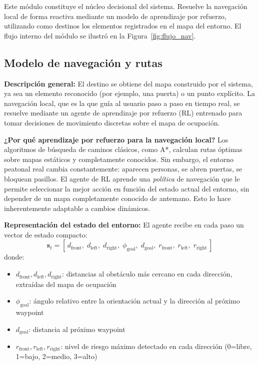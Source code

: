 Este módulo constituye el núcleo decisional del sistema. Resuelve la navegación local
de forma reactiva mediante un modelo de aprendizaje por refuerzo, utilizando como
destinos los elementos registrados en el mapa del entorno. El flujo interno del módulo se ilustró en la Figura~\ref{fig:flujo_nav}.

\subsection{Modelo de navegación y rutas}

\textbf{Descripción general:}
El destino se obtiene del mapa construido por el sistema, ya sea un elemento
reconocido (por ejemplo, una puerta) o un punto explícito. La navegación local, que es
la que guía al usuario paso a paso en tiempo real, se resuelve mediante un agente de aprendizaje por refuerzo (RL) entrenado para tomar decisiones
de movimiento discretas sobre el mapa de ocupación.

\textbf{¿Por qué aprendizaje por refuerzo para la navegación local?}
Los algoritmos de búsqueda de caminos clásicos, como A*, calculan rutas óptimas sobre
mapas estáticos y completamente conocidos. Sin embargo, el entorno peatonal real cambia
constantemente: aparecen personas, se abren puertas, se bloquean pasillos. El agente de
RL aprende una \emph{política} de navegación que le permite seleccionar la mejor acción
en función del estado actual del entorno, sin depender de un mapa completamente conocido
de antemano. Esto lo hace inherentemente adaptable a cambios dinámicos.

\textbf{Representación del estado del entorno:}
El agente recibe en cada paso un vector de estado compacto:
\[
\mathbf{s}_t = [\, d_{\text{front}},\; d_{\text{left}},\; d_{\text{right}},\;
                  \phi_{\text{goal}},\; d_{\text{goal}},\;
                  r_{\text{front}},\; r_{\text{left}},\; r_{\text{right}} \,]
\]
donde:
\begin{itemize}
    \item $d_{\text{front}}, d_{\text{left}}, d_{\text{right}}$: distancias al obstáculo
          más cercano en cada dirección, extraídas del mapa de ocupación
    \item $\phi_{\text{goal}}$: ángulo relativo entre la orientación actual y la dirección
          al próximo waypoint
    \item $d_{\text{goal}}$: distancia al próximo waypoint
    \item $r_{\text{front}}, r_{\text{left}}, r_{\text{right}}$: nivel de riesgo máximo
          detectado en cada dirección (0=libre, 1=bajo, 2=medio, 3=alto)
\end{itemize}

